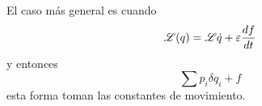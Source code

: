 \documentclass[10pt,oneside]{CBFT_book}
\begin{document}
El caso más general es cuando
\[
	\mathscr{L}(q) = \mathscr{L}{\dot{q}} + \varepsilon \frac{d^{\hspace{-0.05em}} {f}}{d {t}^{\hspace{-0.05em}}}
\]
y entonces
\[
	\sum p_i \delta q_i + f
\]
esta forma toman las constantes de movimiento.



% 

\end{document}
